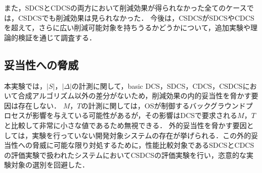 また，SDCSとCDCSの両方において削減効果が得られなかった全てのケースでは，CSDCSでも削減効果は見られなかった．
今後は，CSDCSがSDCSやCDCSを超えて，さらに広い削減可能対象を持ちうるかどうかについて，追加実験や理論的検証を通じて調査する．

\subsection{妥当性への脅威}
本実験では，$|S|$，$|\Delta|$の計測に関して，basic DCS，SDCS，CDCS，CSDCSにおいて合成アルゴリズム以外の差分がないため，削減効果の内的妥当性を脅かす要因は存在しない．
$M$，$T$の計測に関しては，OSが制御するバックグラウンドプロセスが影響を与えている可能性があるが，その影響はDCSで要求される$M$，$T$と比較して非常に小さな値であるため無視できる．
外的妥当性を脅かす要因としては，実験を行っていない開発対象システムの存在が挙げられる．この外的妥当性への脅威に可能な限り対処するために，性能比較対象であるSDCSとCDCSの評価実験で扱われたシステムにおいてCSDCSの評価実験を行い，恣意的な実験対象の選別を回避した．







